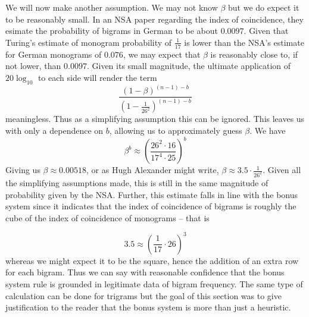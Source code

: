 \noindent We will now make another assumption. We may not know
$\beta$ but we do expect it to be reasonably small. In an NSA paper
regarding the index of coincidence, they esimate the probability of
bigrams in German to be about $0.0097$. Given that Turing's
estimate of monogram probability of $\frac{1}{17}$ is lower than
the NSA's estimate for German monograms of $0.076$, we may expect
that $\beta$ is reasonably close to, if not lower, than $0.0097$.
Given its small magnitude, the ultimate application of
$20\log_{10}$ to each side will render the term
\[
	\frac{(1-\beta)^{(n-1)-b}}{(1-\frac{1}{26^2})^{(n-1)-b}}
\]
meaningless. Thus as a simplifying assumption this can be ignored.
This leaves us with only a dependence on $b$, allowing us to
approximately guess $\beta$. We have
\[
	\beta^b \approx
	(\frac{26^2\cdot16}{17^4\cdot25})^b
\]
Giving us $\beta \approx 0.00518$, or as Hugh Alexander might
write, $\beta \approx 3.5\cdot\frac{1}{26^2}$. Given all the
simplifying assumptions made, this is still in the same magnitude
of probability given by the NSA. Further, this estimate falls in
line with the bonus system since it indicates that the index of
coincidence of bigrams is roughly the cube of the index of
coincidence of monograms -- that is

\[
	3.5 \approx (\frac{1}{17}\cdot26)^3
\]
whereas we might expect it to be the square, hence the addition of
an extra row for each bigram. Thus we can say with reasonable
confidence that the bonus system rule is grounded in legitimate
data of bigram frequency. The same type of calculation can be done
for trigrams but the goal of this section was to give justification
to the reader that the bonus system is more than just a heuristic.

